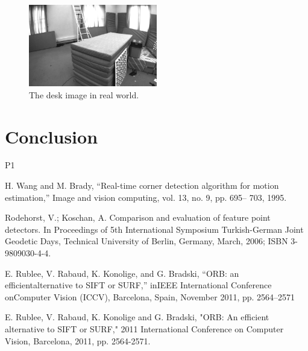 \documentclass[conference]{IEEEtran}
\begin{document}
\begin{figure}
	\label{fig:desk}
	\centering
	\includegraphics[width=0.5\textwidth]{img/desk.png}
	\caption{The desk image in real world.}
\end{figure}




\section{Conclusion}
P1


\begin{thebibliography}{00}

 H. Wang and M. Brady, “Real-time corner detection algorithm for
motion estimation,” Image and vision computing, vol. 13, no. 9, pp. 695–
703, 1995.

 Rodehorst, V.; Koschan, A. Comparison and evaluation of feature point detectors. In Proceedings
of 5th International Symposium Turkish-German Joint Geodetic Days, Technical University of
Berlin, Germany, March, 2006; ISBN 3-9809030-4-4.

 E. Rublee, V. Rabaud, K. Konolige, and G. Bradski, “ORB: an efficientalternative  to  SIFT  or  SURF,”  inIEEE  International  Conference  onComputer Vision (ICCV), Barcelona, Spain, November 2011, pp. 2564–2571

 E. Rublee, V. Rabaud, K. Konolige and G. Bradski, "ORB: An efficient alternative to SIFT or SURF," 2011 International Conference on Computer Vision, Barcelona, 2011, pp. 2564-2571.



\end{thebibliography}
\end{document}
